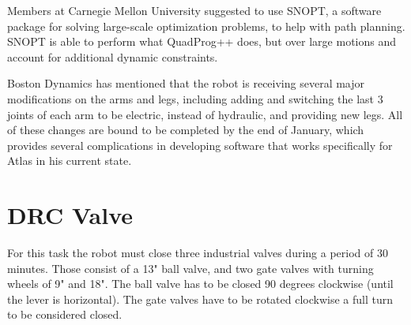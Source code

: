 \documentclass[12pt]{report}
\begin{document}
Members at Carnegie Mellon University suggested to use SNOPT, a software package for solving large-scale optimization problems, to help with path planning. SNOPT is able to perform what QuadProg++ does, but over large motions and account for additional dynamic constraints. 

Boston Dynamics has mentioned that the robot is receiving several major modifications on the arms and legs, including adding and switching the last 3 joints of each arm to be electric, instead of hydraulic, and providing new legs. All of these changes are bound to be completed by the end of January, which provides several complications in developing software that works specifically for Atlas in his current state. 

\section{DRC Valve}

For this task the robot must close three industrial valves during a period of 30 minutes. Those consist of a 13" ball valve, and two gate valves with turning wheels of 9" and 18". The ball valve has to be closed 90 degrees clockwise (until the lever is horizontal). The gate valves have to be rotated clockwise a full turn to be considered closed.  \cite{valvetask}
\end{document}
